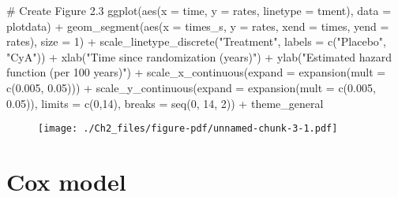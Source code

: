 \documentclass[
  letterpaper,
  DIV=11,
  numbers=noendperiod]{scrreprt}
\newenvironment{Shaded}{\begin{snugshade}}{\end{snugshade}}
\newcommand{\AttributeTok}[1]{\textcolor[rgb]{0.40,0.45,0.13}{#1}}
\newcommand{\CommentTok}[1]{\textcolor[rgb]{0.37,0.37,0.37}{#1}}
\newcommand{\DecValTok}[1]{\textcolor[rgb]{0.68,0.00,0.00}{#1}}
\newcommand{\FloatTok}[1]{\textcolor[rgb]{0.68,0.00,0.00}{#1}}
\newcommand{\FunctionTok}[1]{\textcolor[rgb]{0.28,0.35,0.67}{#1}}
\newcommand{\NormalTok}[1]{\textcolor[rgb]{0.00,0.23,0.31}{#1}}
\newcommand{\SpecialCharTok}[1]{\textcolor[rgb]{0.37,0.37,0.37}{#1}}
\newcommand{\StringTok}[1]{\textcolor[rgb]{0.13,0.47,0.30}{#1}}
\begin{document}
\begin{Shaded}
\begin{Highlighting}[]
\CommentTok{\# Create Figure 2.3}
\FunctionTok{ggplot}\NormalTok{(}\FunctionTok{aes}\NormalTok{(}\AttributeTok{x =}\NormalTok{ time, }\AttributeTok{y =}\NormalTok{ rates, }\AttributeTok{linetype =}\NormalTok{ tment),}
                \AttributeTok{data =}\NormalTok{ plotdata) }\SpecialCharTok{+}
  \FunctionTok{geom\_segment}\NormalTok{(}\FunctionTok{aes}\NormalTok{(}\AttributeTok{x =}\NormalTok{ times\_s, }\AttributeTok{y =}\NormalTok{ rates, }\AttributeTok{xend =}\NormalTok{ times, }\AttributeTok{yend =}\NormalTok{ rates), }\AttributeTok{size =} \DecValTok{1}\NormalTok{) }\SpecialCharTok{+}
  \FunctionTok{scale\_linetype\_discrete}\NormalTok{(}\StringTok{"Treatment"}\NormalTok{, }\AttributeTok{labels =} \FunctionTok{c}\NormalTok{(}\StringTok{"Placebo"}\NormalTok{, }\StringTok{"CyA"}\NormalTok{))  }\SpecialCharTok{+}
  \FunctionTok{xlab}\NormalTok{(}\StringTok{"Time since randomization (years)"}\NormalTok{) }\SpecialCharTok{+}
  \FunctionTok{ylab}\NormalTok{(}\StringTok{"Estimated hazard function (per 100 years)"}\NormalTok{) }\SpecialCharTok{+}
  \FunctionTok{scale\_x\_continuous}\NormalTok{(}\AttributeTok{expand =} \FunctionTok{expansion}\NormalTok{(}\AttributeTok{mult =} \FunctionTok{c}\NormalTok{(}\FloatTok{0.005}\NormalTok{, }\FloatTok{0.05}\NormalTok{))) }\SpecialCharTok{+}
  \FunctionTok{scale\_y\_continuous}\NormalTok{(}\AttributeTok{expand =} \FunctionTok{expansion}\NormalTok{(}\AttributeTok{mult =} \FunctionTok{c}\NormalTok{(}\FloatTok{0.005}\NormalTok{, }\FloatTok{0.05}\NormalTok{)), }
                     \AttributeTok{limits =} \FunctionTok{c}\NormalTok{(}\DecValTok{0}\NormalTok{,}\DecValTok{14}\NormalTok{), }\AttributeTok{breaks =} \FunctionTok{seq}\NormalTok{(}\DecValTok{0}\NormalTok{, }\DecValTok{14}\NormalTok{, }\DecValTok{2}\NormalTok{)) }\SpecialCharTok{+}
\NormalTok{  theme\_general}
\end{Highlighting}
\end{Shaded}

\begin{figure}[H]

{\centering \texttt{[image: ./Ch2\_files/figure-pdf/unnamed-chunk-3-1.pdf]}

}

\end{figure}

\hypertarget{cox-models}{%
\section*{Cox model}\label{cox-models}}
\end{document}
